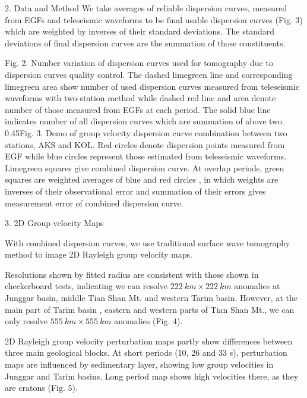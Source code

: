 \documentclass[
    landscape,      %
    paperwidth = 1200mm,
    paperheight = 900mm,
    fontscale = 0.4,
    margin = 1.7cm,
]{baposter}
\begin{document}
\begin{poster}
\begin{posterbox}[column=0, below=auto]{2. Data and Method}
We take averages of reliable dispersion curves, measured from EGFs and teleseismic waveforms to be final
usable dispersion curves (Fig. 3) which are weighted by inverses of their standard deviations. The standard
deviations of final dispersion curves are the summation of those constituents.

\hspace{0.15cm}

{Fig. 2.}
{Number variation of dispersion curves used for tomography due to dispersion curves quality control. The dashed limegreen line and corresponding limegreen area show
number of used dispersion curves measured from teleseismic waveforms with two-station method while dashed red line and area denote number of those measured from EGFs at each period. The
solid blue line indicates number of all dispersion curves which are summation of above two.}
{0.45\textwidth}{Fig. 3.}
{Demo of group velocity dispersion curve combination between two stations, AKS and KOL.
Red circles denote dispersion points measured from EGF while blue circles represent those estimated from teleseismic waveforms.
Limegreen squares give combined dispersion curve. At overlap periods, green squares are weighted averages of blue and red circles
, in which weights are inverses of their observational error and summation of their errors gives measurement error of combined dispersion curve.
}



\end{posterbox}

\begin{posterbox}[column=1]{3. 2D Group velocity Maps}

With combined dispersion curves, we use traditional surface wave tomography method
to image 2D Rayleigh group velocity maps.

Resolutions shown by fitted radius are
consistent with those shown in checkerboard tests, indicating we can
resolve $222 \ \textit{km} \times 222 \ \textit{km}$ anomalies at Junggar basin,
middle Tian Shan Mt. and  western Tarim basin. However, at the main part of Tarim basin ,
eastern and western parts of Tian Shan Mt., we can only resolve $555 \ \textit{km} \times 555 \ \textit{km}$
anomalies (Fig. 4).

2D Rayleigh group velocity perturbation maps partly show differences between three main geological
blocks. At short periods (10, 26 and 33 s),  perturbation maps are influenced by sedimentary layer, showing
low group velocities in Junggar and Tarim basins. Long period map shows high velocities there, as they are cratons (Fig. 5).


\end{posterbox}
\end{poster}
\end{document}
